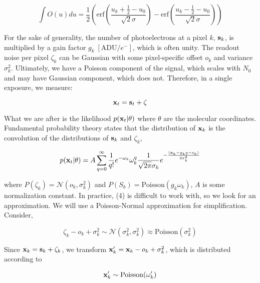 \documentclass{article}
\begin{document}
\begin{equation}
\int O(u)du = \frac{1}{2}\left(\mathrm{erf}\left(\frac{u_{k}+\frac{1}{2}-u_{0}}{\sqrt{2}\sigma}\right) -\mathrm{erf}\left(\frac{u_{k}-\frac{1}{2}-u_{0}}{\sqrt{2}\sigma}\right)\right)
\end{equation}

For the sake of generality, the number of photoelectrons at a pixel $k$, $\bold{s}_k$, is  multiplied by a gain factor $g_k \;[\mathrm{ADU}/e^{-}]$, which is often unity. The readout noise per pixel $\zeta_{k}$ can be Gaussian with some pixel-specific offset $o_{k}$ and variance $\sigma_{k}^{2}$. Ultimately, we have a Poisson component of the signal, which scales with $N_{0}$ and may have Gaussian component, which does not. Therefore, in a single exposure, we measure: 

\begin{equation}
\bold{x}_t = \bold{s}_t + \bold{\zeta}
\end{equation}

What we are after is the likelihood $p(\bold{x}_{t}|\theta)$ where $\theta$ are the molecular coordinates. Fundamental probability theory states that the distribution of $\bold{x}_{k}$ is the convolution of the distributions of $\bold{s}_{k}$ and $\zeta_{k}$,

\begin{equation}
p(\bold{x}_{t}|\theta) = A\sum_{q=0}^{\infty} \frac{1}{q!}e^{-\omega_{k}}\omega_{k}^{q}\frac{1}{\sqrt{2\pi}\sigma_{k}}e^{-\frac{(\bold{x}_{k}-g_{k}q-o_{k})}{2\sigma_{k}^{2}}}
\end{equation}

where $P(\zeta_{k}) = \mathcal{N}(o_{k},\sigma_{k}^{2})$ and $P(S_{k}) = \mathrm{Poisson}(g_{k}\omega_{k})$,  $A$ is some normalization constant. In practice, (4) is difficult to work with, so we look for an approximation. We will use a Poisson-Normal approximation for simplification. Consider,

\begin{equation}
\zeta_{k} - o_{k} + \sigma_{k}^{2} \sim \mathcal{N}(\sigma_{k}^{2},\sigma_{k}^{2}) \approx \mathrm{Poisson}(\sigma_{k}^{2})
\end{equation}

Since $\bold{x}_{k} = \bold{s}_{k} + \zeta_{k}$, we transform $\bold{x}_{k}' = \bold{x}_{k} - o_{k} + \sigma_{k}^{2}$, which is distributed according to 

\begin{equation}
\bold{x}_{k}' \sim \mathrm{Poisson}(\omega_{k}')
\end{equation}
\end{document}
